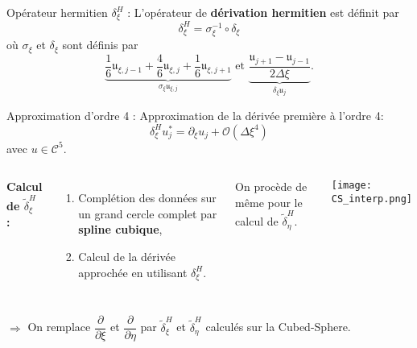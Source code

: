 \documentclass[11pt]{beamer}
\def\dxi{\tilde{\delta}^H_{\xi}}
\def\deta{\tilde{\delta}^H_{\eta}}
\begin{document}
\begin{frame}{}
\begin{block}{Opérateur hermitien $\delta_{\xi}^H$ :}
L'opérateur de \textbf{dérivation hermitien} est définit par
$$
\delta_{\xi}^H = \sigma_{\xi}^{-1} \circ \delta_{\xi}
$$
où $\sigma_{\xi}$ et $\delta_{\xi}$ sont définis par
$$
\underbrace{\dfrac{1}{6}\mathfrak{u}_{\xi,j-1} + \dfrac{4}{6}\mathfrak{u}_{\xi,j} + \dfrac{1}{6} \mathfrak{u}_{\xi,j+1} }_{\sigma_{\xi} \mathfrak{u}_{\xi,j}} \text{ et } \underbrace{\dfrac{\mathfrak{u}_{j+1}-\mathfrak{u}_{j-1}}{2 \Delta \xi}}_{\delta_{\xi} \mathfrak{u}_j}.
$$
\end{block}

\begin{block}{Approximation d'ordre 4 :}
Approximation de la dérivée première à l'ordre 4:
$$
\delta_{\xi}^H u^*_j = \partial_{\xi} u_j + \mathcal{O} \left( \Delta \xi^4 \right)
$$
avec $u \in \mathcal{C}^5$.
\end{block}
\end{frame}










\begin{frame}
\begin{columns}
\textbf{Calcul de $\dxi$ :}
\begin{enumerate}
\item Complétion des données sur un grand cercle complet par \textbf{spline cubique},
\item Calcul de la dérivée approchée en utilisant $\delta_{\xi}^H$.
\end{enumerate}
On procède de même pour le calcul de $\deta$.

\begin{center}
\texttt{[image: CS\_interp.png]}
\end{center}
\end{columns}

$\Rightarrow$ On remplace $\dfrac{\partial}{\partial \xi}$ et $\dfrac{\partial}{\partial \eta}$ par $\dxi$ et $\deta$ calculés sur la Cubed-Sphere.
\end{frame}
\end{document}

